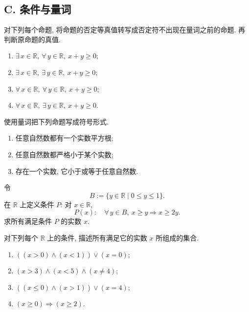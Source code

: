 \documentclass[usesamecnt, thmcnt=section, lang=cn, newtx, 10pt, scheme=chinese]{elegantbook}
\begin{document}
\subsection*{C. 条件与量词}

\begin{exercise}\label{ex:sets-13}
对下列每个命题, 将命题的否定等真值转写成否定符不出现在量词之前的命题. 再判断原命题的真值.
\begin{enumerate}[label=\rm(\arabic*)]
  \item $\exists\,x\in\mathbb R,\ \forall\,y\in\mathbb R,\ x+y\geq0$;
  \item $\exists\,x\in\mathbb R,\ \exists\,y\in\mathbb R,\ x+y\geq0$;
  \item $\forall\,x\in\mathbb R,\ \forall\,y\in\mathbb R,\ x+y\geq0$;
  \item $\forall\,x\in\mathbb R,\ \exists\,y\in\mathbb R,\ x+y\geq0$.
\end{enumerate}
\end{exercise}

\begin{exercise}\label{ex:sets-14}
使用量词把下列命题写成符号形式.
\begin{enumerate}[label=\rm(\arabic*)]
  \item 任意自然数都有一个实数平方根;
  \item 任意自然数都严格小于某个实数;
  \item 存在一个实数, 它小于或等于任意自然数.
\end{enumerate}
\end{exercise}

\begin{exercise}\label{ex:sets-15}
令
\[
 B:=\{y\in\mathbb R\mid 0\leq y\leq1\}.
\]
在 $\mathbb R$ 上定义条件 $P $: 对 $x\in\mathbb R$,
\[
 P(x):\quad
 \forall\,y\in B,\ x\geq y\Rightarrow x\geq2y.
\]
求所有满足条件 $P $ 的实数 $x$.
\end{exercise}

\begin{exercise}\label{ex:sets-16}
对下列每个 $\mathbb R$ 上的条件, 描述所有满足它的实数 $x$ 所组成的集合.
\begin{enumerate}[label=\rm(\arabic*)]
  \item $((x>0)\wedge(x<1))\vee(x=0)$;
  \item $(x>3)\wedge(x<5)\wedge(x\neq4)$;
  \item $((x\leq0)\wedge(x>1))\vee(x=4)$;
  \item $(x\geq0)\Rightarrow(x\geq2)$.
\end{enumerate}
\end{exercise}
\end{document}

